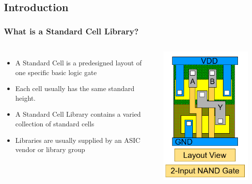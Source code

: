 \documentclass[compress]{beamer}
\begin{document}
	\subsection[Intro]{Introduction}
	\begin{frame}
		\frametitle{What is a Standard Cell Library?}
		\begin{columns}	
			\begin{itemize}
				\item A Standard Cell is a predesigned
				layout of one specific basic logic gate
				\item Each cell usually has the same
				standard height.
				\item A Standard Cell Library contains a
				varied collection of standard cells
				\item Libraries are usually supplied by an ASIC vendor or library group
			
			\end{itemize}
			\begin{center}
				\includegraphics[width=0.8 \textwidth]{Layout View}
			\end{center}
		\end{columns}
	\end{frame}
\end{document}
